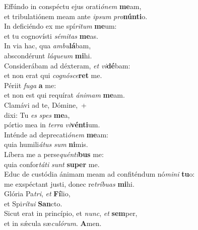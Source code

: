 \evenverse Effúndo in conspéctu ejus orati\textit{ó}\textit{nem} \textbf{me}am,~\*\\
\evenverse et tribulatiónem meam ante \textit{i}\textit{psum} \textit{pro}\textbf{nún}\textbf{ti}o.\\
\oddverse In deficiéndo ex me spí\textit{ri}\textit{tum} \textbf{me}um:~\*\\
\oddverse et tu cognovísti \textit{sé}\textit{mi}\textit{tas} \textbf{me}as.\\
\evenverse In via hac, qua \textit{am}\textit{bu}\textbf{lá}bam,~\*\\
\evenverse abscondérunt \textit{lá}\textit{que}\textit{um} \textbf{mi}hi.\\
\oddverse Considerábam ad déxteram, \textit{et} \textit{vi}\textbf{dé}bam:~\*\\
\oddverse et non erat qui \textit{co}\textit{gnó}\textit{sce}\textbf{ret} me.\\
\evenverse Périit \textit{fu}\textit{ga} \textbf{a} me:~\*\\
\evenverse et non est qui requírat \textit{á}\textit{ni}\textit{mam} \textbf{me}am.\\
\oddverse Clamávi ad te, Dómine,~+\\
\oddverse  dixi: Tu \textit{es} \textit{spes} \textbf{me}a,~\*\\
\oddverse pórtio mea in \textit{ter}\textit{ra} \textit{vi}\textbf{vén}\textbf{ti}um.\\
\evenverse Inténde ad deprecati\textit{ó}\textit{nem} \textbf{me}am:~\*\\
\evenverse quia humili\textit{á}\textit{tus} \textit{sum} \textbf{ni}mis.\\
\oddverse Líbera me a perse\textit{quén}\textit{ti}\textbf{bus} me:~\*\\
\oddverse quia confor\textit{tá}\textit{ti} \textit{sunt} \textbf{su}\textbf{per} me.\\
\evenverse Educ de custódia ánimam meam ad confiténdum nó\textit{mi}\textit{ni} \textbf{tu}o:~\*\\
\evenverse me exspéctant justi, donec re\textit{trí}\textit{bu}\textit{as} \textbf{mi}hi.\\
\oddverse Glória Pa\textit{tri}, \textit{et} \textbf{Fí}lio,~\*\\
\oddverse et Spi\textit{rí}\textit{tu}\textit{i} \textbf{San}cto.\\
\evenverse Sicut erat in princípio, et \textit{nunc}, \textit{et} \textbf{sem}per,~\*\\
\evenverse et in sǽcula sæ\textit{cu}\textit{ló}\textit{rum}. \textbf{A}men.\\
